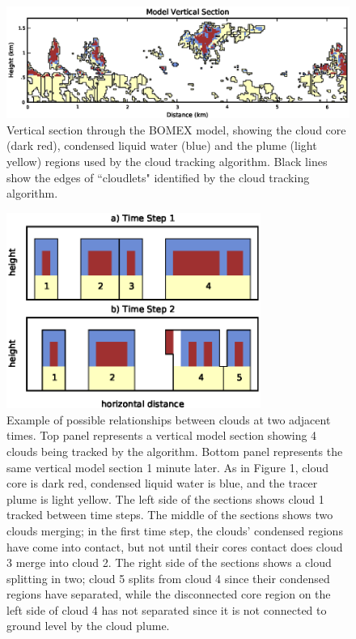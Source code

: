 \documentclass[acp]{copernicus}
\begin{document}
\begin{figure}[t]
\vspace*{2mm}
\begin{center}
\includegraphics[width=\textwidth]{./figures/vertical_section}
\end{center}
\caption{Vertical section through the BOMEX model, showing the cloud core
(dark red), condensed liquid water (blue) and the plume (light yellow) regions 
used by the cloud tracking algorithm. Black lines show the edges of 
``cloudlets" identified by the cloud tracking algorithm.}
\label{fig:vertical_section}
\end{figure}

\begin{figure}[t]
\vspace*{2mm}
\begin{center}
\includegraphics[width=8.3cm]{./figures/cloudfinder_instructions}
\end{center}
\caption{Example of possible relationships between clouds at two adjacent 
times.  Top panel represents a vertical model section showing 4 clouds being 
tracked by the algorithm. Bottom panel represents the same vertical model 
section 1 minute later. As in Figure 1, cloud core is dark red, condensed 
liquid water is blue, and the tracer plume is light yellow.  The left side of 
the sections shows cloud 1 tracked between time steps.  The middle of the 
sections shows two clouds merging; in the first time step, the clouds' 
condensed regions have come into contact, but not until their cores contact 
does cloud 3 merge into cloud 2. The right side of the sections shows a cloud 
splitting in two; cloud 5 splits from cloud 4 since their condensed regions 
have separated, while the disconnected core region on the left side of cloud 4 
has not separated since it is not connected to ground level by the cloud 
plume.}
\label{fig:cloudfinder_instructions}
\end{figure}
\end{document}
